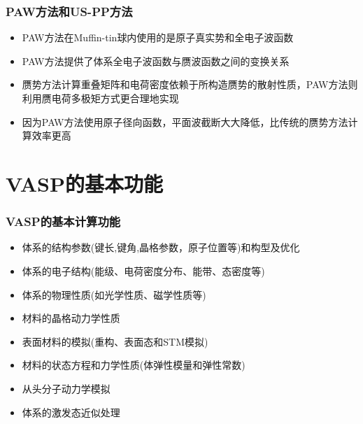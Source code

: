 \documentclass[cjk,slidestop,compress,mathserif,blue]{beamer}
\begin{document}

\frame
{
\frametitle{PAW方法和US-PP方法}
\begin{itemize}
\setlength{\itemsep}{15pt}
	\item \textrm{PAW}方法在\textrm{Muffin-tin}球内使用的是原子真实势和全电子波函数
	\item \textrm{PAW}方法提供了体系全电子波函数与赝波函数之间的变换关系
	\item 赝势方法计算重叠矩阵和电荷密度依赖于所构造赝势的散射性质，\textrm{PAW}方法则利用赝电荷多极矩方式更合理地实现
	\item 因为\textrm{PAW}方法使用原子径向函数，平面波截断大大降低，比传统的赝势方法计算效率更高
	\end{itemize}
}

\section{VASP的基本功能}
\frame
{
\frametitle{VASP的基本计算功能}
\begin{itemize}
      \setlength{\itemsep}{8pt}
	\item 体系的结构参数(键长,键角,晶格参数，原子位置等)和构型及优化
	\item 体系的电子结构(能级、电荷密度分布、能带、态密度等)
	\item 体系的物理性质(如光学性质、磁学性质等)
	\item 材料的晶格动力学性质
	\item 表面材料的模拟(重构、表面态和\textrm{STM}模拟)
	\item 材料的状态方程和力学性质(体弹性模量和弹性常数)
	\item 从头分子动力学模拟
	\item 体系的激发态近似处理
\end{itemize}
}
\end{document}
